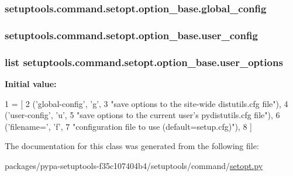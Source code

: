 \subsubsection[{global\+\_\+config}]{\setlength{\rightskip}{0pt plus 5cm}setuptools.\+command.\+setopt.\+option\+\_\+base.\+global\+\_\+config}\label{classsetuptools_1_1command_1_1setopt_1_1option__base_a84a54e15422a6d7d41046ea769a7b061}
\hypertarget{classsetuptools_1_1command_1_1setopt_1_1option__base_abf3e8d8871be902ab84f02921b83b0e1}{}
\subsubsection[{user\+\_\+config}]{\setlength{\rightskip}{0pt plus 5cm}setuptools.\+command.\+setopt.\+option\+\_\+base.\+user\+\_\+config}\label{classsetuptools_1_1command_1_1setopt_1_1option__base_abf3e8d8871be902ab84f02921b83b0e1}
\hypertarget{classsetuptools_1_1command_1_1setopt_1_1option__base_aa4e854fb82408f33f0f30d083e3dfb1c}{}
\subsubsection[{user\+\_\+options}]{\setlength{\rightskip}{0pt plus 5cm}list setuptools.\+command.\+setopt.\+option\+\_\+base.\+user\+\_\+options\hspace{0.3cm}{\ttfamily [static]}}\label{classsetuptools_1_1command_1_1setopt_1_1option__base_aa4e854fb82408f33f0f30d083e3dfb1c}
{\bfseries Initial value\+:}
\begin{DoxyCode}
1 = [
2         (\textcolor{stringliteral}{'global-config'}, \textcolor{stringliteral}{'g'},
3          \textcolor{stringliteral}{"save options to the site-wide distutils.cfg file"}),
4         (\textcolor{stringliteral}{'user-config'}, \textcolor{stringliteral}{'}\textcolor{stringliteral}{u',}
5 \textcolor{stringliteral}{         }\textcolor{stringliteral}{"save options to the current user's pydistutils.cfg file"}),
6         (\textcolor{stringliteral}{'filename='}, \textcolor{stringliteral}{'f'},
7          \textcolor{stringliteral}{"configuration file to use (default=setup.cfg)"}),
8     ]
\end{DoxyCode}


The documentation for this class was generated from the following file\+:\begin{DoxyCompactItemize}
\item 
packages/pypa-\/setuptools-\/f35c107404b4/setuptools/command/\hyperlink{setopt_8py}{setopt.\+py}\end{DoxyCompactItemize}
